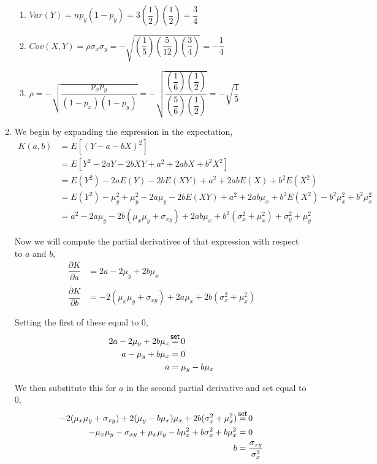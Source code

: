 \documentclass{article}
\newcommand\seteq{\mathrel{\overset{\makebox[0pt]{\mbox{\normalfont\small\sffamily set}}}{=}}}
\newcommand\mfrac[2]{\left(\dfrac{#1}{#2}\right)}
\begin{document}
\begin{enumerate}
\begin{enumerate}
       \item
	$Var(Y) = np_y(1-p_y) = 3\mfrac{1}{2}\mfrac{1}{2} = \dfrac{3}{4}$
       
       \item $Cov(X,Y) = \rho \sigma_x \sigma_y 
	  = -\sqrt{\mfrac{1}{5}\mfrac{5}{12}\mfrac{3}{4}} = -\dfrac{1}{4}$
       
       \item
	$\rho = -\sqrt{\dfrac{p_x p_y}{(1-p_x)(1-p_y)}} 
	  = -\sqrt{\dfrac{\mfrac{1}{6}\mfrac{1}{2}}{\mfrac{5}{6}\mfrac{1}{2}}}
	  = -\sqrt{\dfrac{1}{5}}$
      \end{enumerate}
     
     \item
      We begin by expanding the expression in the expectation,
      \begin{align*}
       K(a,b) &= E[(Y - a - bX)^2] \\
	&= E[Y^2 - 2aY - 2bXY + a^2 + 2abX + b^2X^2] \\
	&= E(Y^2) - 2aE(Y) - 2bE(XY) + a^2 + 2abE(X) + b^2E(X^2) \\
	&= E(Y^2) - \mu_y^2 + \mu_y^2 - 2a\mu_y - 2bE(XY) + a^2
	  + 2ab\mu_x + b^2E(X^2) - b^2\mu_x^2 + b^2\mu_x^2 \\
	&= a^2 - 2a\mu_y - 2b(\mu_x\mu_y + \sigma_{xy}) + 2ab\mu_x + b^2(\sigma_x^2 
	  + \mu_x^2) + \sigma_y^2 + \mu_y^2
      \end{align*}

      Now we will compute the partial derivatives of that expression with respect to $a$ and $b$,
      \begin{align*}
       \dfrac{\partial K}{\partial a} &= 2a -2\mu_y + 2b\mu_x \\
       \\
       \dfrac{\partial K}{\partial b} &= -2(\mu_x\mu_y + \sigma_{xy}) + 2a\mu_x
	  + 2b(\sigma_x^2 + \mu_x^2)
      \end{align*}

      Setting the first of these equal to 0,
      \begin{align*}
       2a - 2\mu_y + 2b\mu_x &\seteq 0 \\
       a - \mu_y + b\mu_x &= 0 \\
       a &= \mu_y - b\mu_x
      \end{align*}

      We then substitute this for $a$ in the second partial derivative and set equal to 0,
      \begin{align*}
       -2(\mu_x\mu_y + \sigma_{xy}) + 2(\mu_y - b\mu_x)\mu_x + 2b(\sigma_x^2 + \mu_x^2) &\seteq 0 \\
       -\mu_x\mu_y - \sigma_{xy} + \mu_x\mu_y - b\mu_x^2 + b\sigma_x^2 + b\mu_x^2 &= 0 \\
       b &= \dfrac{\sigma_{xy}}{\sigma_x^2}
      \end{align*}
      

\end{enumerate}
\end{document}
